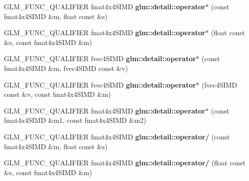 \begin{DoxyCompactItemize}
\item 
\hypertarget{namespaceglm_1_1detail_a56fc3932025be61fb9a7cb14005c0d00}{G\-L\-M\-\_\-\-F\-U\-N\-C\-\_\-\-Q\-U\-A\-L\-I\-F\-I\-E\-R fmat4x4\-S\-I\-M\-D {\bfseries glm\-::detail\-::operator$\ast$} (const fmat4x4\-S\-I\-M\-D \&m, float const \&s)}\label{namespaceglm_1_1detail_a56fc3932025be61fb9a7cb14005c0d00}

\item 
\hypertarget{namespaceglm_1_1detail_a8ab387a0948c211143bbb41dd8fda30c}{G\-L\-M\-\_\-\-F\-U\-N\-C\-\_\-\-Q\-U\-A\-L\-I\-F\-I\-E\-R fmat4x4\-S\-I\-M\-D {\bfseries glm\-::detail\-::operator$\ast$} (float const \&s, const fmat4x4\-S\-I\-M\-D \&m)}\label{namespaceglm_1_1detail_a8ab387a0948c211143bbb41dd8fda30c}

\item 
\hypertarget{namespaceglm_1_1detail_a8ba6a9d268faa4277d6734a2da036c4d}{G\-L\-M\-\_\-\-F\-U\-N\-C\-\_\-\-Q\-U\-A\-L\-I\-F\-I\-E\-R fvec4\-S\-I\-M\-D {\bfseries glm\-::detail\-::operator$\ast$} (const fmat4x4\-S\-I\-M\-D \&m, fvec4\-S\-I\-M\-D const \&v)}\label{namespaceglm_1_1detail_a8ba6a9d268faa4277d6734a2da036c4d}

\item 
\hypertarget{namespaceglm_1_1detail_a0f6596e928f7dc3fb62a38bb5df08d18}{G\-L\-M\-\_\-\-F\-U\-N\-C\-\_\-\-Q\-U\-A\-L\-I\-F\-I\-E\-R fvec4\-S\-I\-M\-D {\bfseries glm\-::detail\-::operator$\ast$} (fvec4\-S\-I\-M\-D const \&v, const fmat4x4\-S\-I\-M\-D \&m)}\label{namespaceglm_1_1detail_a0f6596e928f7dc3fb62a38bb5df08d18}

\item 
\hypertarget{namespaceglm_1_1detail_a628d3f0d2c16d6207ca18a11ad66261c}{G\-L\-M\-\_\-\-F\-U\-N\-C\-\_\-\-Q\-U\-A\-L\-I\-F\-I\-E\-R fmat4x4\-S\-I\-M\-D {\bfseries glm\-::detail\-::operator$\ast$} (const fmat4x4\-S\-I\-M\-D \&m1, const fmat4x4\-S\-I\-M\-D \&m2)}\label{namespaceglm_1_1detail_a628d3f0d2c16d6207ca18a11ad66261c}

\item 
\hypertarget{namespaceglm_1_1detail_aa8f3ac302faac4a9d5c0e49321ccf9cb}{G\-L\-M\-\_\-\-F\-U\-N\-C\-\_\-\-Q\-U\-A\-L\-I\-F\-I\-E\-R fmat4x4\-S\-I\-M\-D {\bfseries glm\-::detail\-::operator/} (const fmat4x4\-S\-I\-M\-D \&m, float const \&s)}\label{namespaceglm_1_1detail_aa8f3ac302faac4a9d5c0e49321ccf9cb}

\item 
\hypertarget{namespaceglm_1_1detail_a33235564824caa327d104e227bc64045}{G\-L\-M\-\_\-\-F\-U\-N\-C\-\_\-\-Q\-U\-A\-L\-I\-F\-I\-E\-R fmat4x4\-S\-I\-M\-D {\bfseries glm\-::detail\-::operator/} (float const \&s, const fmat4x4\-S\-I\-M\-D \&m)}\label{namespaceglm_1_1detail_a33235564824caa327d104e227bc64045}


\end{DoxyCompactItemize}
